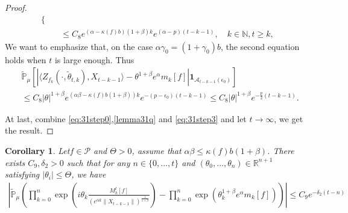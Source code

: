 \documentclass[12pt,oneside,english]{amsart}
\theoremstyle{plain}
\newtheorem{cor}[thm]{Corollary}
\theoremstyle{definition}
\numberwithin{equation}{section}
\begin{document}
\begin{proof}
\begin{align}
\begin{cases}
    \end{cases}
    \\& \leq C_8 e^{(\alpha-\kappa(f)b)(1+\beta)k}e^{(\alpha-p)(t-k-1)}, \quad k\in \mathbb{N}, t\geq k,
\end{align}
We want to emphasize that, on the case $\alpha\gamma_0=(1+\gamma_0)b$, the second equation holds when $t$ is large enough. Thus
\begin{align}
    &\mathbb{\tilde{P}}_{\mu}\left[\left|\langle Z_{f_k}(\cdot,\tilde{\theta}_{t,k}),X_{t-k-1}\rangle-\theta^{1+\beta}e^{\alpha}m_k[f]\right|\mathbf{1}_{\mathcal{A}_{t-k-1}(\epsilon_0)}\right]
    \\ & \leq C_8 |\theta|^{1+\beta}e^{(\alpha\beta-\kappa(f)b(1+\beta))k}e^{-(p-\epsilon_0)(t-k-1)} \leq C_8 |\theta|^{1+\beta}e^{-\frac{p}{2}(t-k-1)}.
\end{align}

At last, combine \eqref{eq:31step0},\eqref{lemma31q} and \eqref{eq:31step3} and let $t\rightarrow\infty$, we get the result.
\end{proof}
\begin{cor}\label{corollary31}
Let$f\in \mathcal{P}$ and $\Theta>0$, assume that $\alpha\beta\leq\kappa(f)b(1+\beta)$. There exists $C_9,\delta_2>0$ such that for any $n \in \{0,...,t\}$ and $(\theta_0,...,\theta_n)\in \mathbb{R}^{n+1}$ satisfying $|\theta_i|\leq \Theta$, we have
\begin{align}
\label{32corollary}
    \left|\mathbb{\tilde{P}}_{\mu}\left(\prod_{k=0}^n\exp(i\theta_k \frac {M_k^t[f]}{(e^{\alpha k}\|X_{t-k-1}\|)^\frac{1}{1+\beta}})-\prod_{k=0}^n\exp(\theta_k^{1+\beta}e^{\alpha}m_k[f])\right)\right|\leq C_9 e^{-\delta_2(t-n)}
\end{align}
\end{cor}
\end{document}
